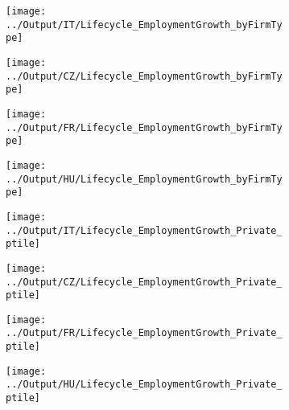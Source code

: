 \documentclass[12pt,notitlepage]{article}
\begin{document}
\begin{figure}[!htpb]
\centering
\caption{Average Employment Growth by Year}
\begin{subfigure}{.49\textwidth}
    \centering
 \texttt{[image: ../Output/IT/Lifecycle\_EmploymentGrowth\_byFirmType]}
\end{subfigure}%
\begin{subfigure}{.49\textwidth}
    \centering
 \texttt{[image: ../Output/CZ/Lifecycle\_EmploymentGrowth\_byFirmType]}
\end{subfigure}
\begin{subfigure}{.49\textwidth}
    \centering
 \texttt{[image: ../Output/FR/Lifecycle\_EmploymentGrowth\_byFirmType]}
\end{subfigure}%
\begin{subfigure}{.49\textwidth}
    \centering
 \texttt{[image: ../Output/HU/Lifecycle\_EmploymentGrowth\_byFirmType]}
\end{subfigure}
\end{figure}
\pagebreak



\begin{figure}[!htpb]
\centering
\caption{Employment Growth (Percentile - Private)}
\begin{subfigure}{.49\textwidth}
    \centering
 \texttt{[image: ../Output/IT/Lifecycle\_EmploymentGrowth\_Private\_ptile]}
\end{subfigure}%
\begin{subfigure}{.49\textwidth}
    \centering
 \texttt{[image: ../Output/CZ/Lifecycle\_EmploymentGrowth\_Private\_ptile]}
\end{subfigure}
\begin{subfigure}{.49\textwidth}
    \centering
 \texttt{[image: ../Output/FR/Lifecycle\_EmploymentGrowth\_Private\_ptile]}
\end{subfigure}%
\begin{subfigure}{.49\textwidth}
    \centering
 \texttt{[image: ../Output/HU/Lifecycle\_EmploymentGrowth\_Private\_ptile]}
\end{subfigure}
\end{figure}
\pagebreak
\end{document}
